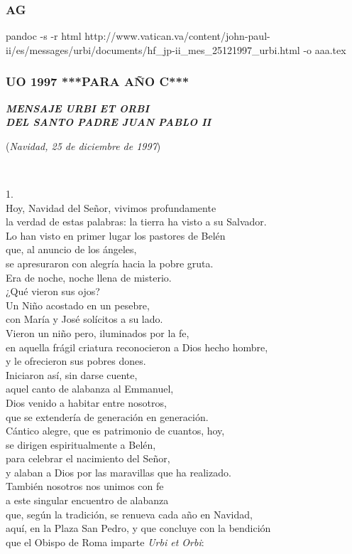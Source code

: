 \subsubsection{AG } pandoc -s -r html http://www.vatican.va/content/john-paul-ii/es/messages/urbi/documents/hf_jp-ii_mes_25121997_urbi.html -o aaa.tex

\subsubsection{UO 1997 ***PARA AÑO C*** } \emph{\textbf{MENSAJE URBI ET ORBI\\ DEL SANTO PADRE JUAN PABLO II}}

(\emph{Navidad, 25 de diciembre de 1997})

~

1. \\ Hoy, Navidad del Señor, vivimos profundamente\\ la verdad de estas palabras: la tierra ha visto a su Salvador.\\ Lo han visto en primer lugar los pastores de Belén\\ que, al anuncio de los ángeles,\\ se apresuraron con alegría hacia la pobre gruta.\\ Era de noche, noche llena de misterio.\\ ¿Qué vieron sus ojos?\\ Un Niño acostado en un pesebre,\\ con María y José solícitos a su lado.\\ Vieron un niño pero, iluminados por la fe,\\ en aquella frágil criatura reconocieron a Dios hecho hombre,\\ y le ofrecieron sus pobres dones.\\ Iniciaron así, sin darse cuente,\\ aquel canto de alabanza al Emmanuel,\\ Dios venido a habitar entre nosotros,\\ que se extendería de generación en generación.\\ Cántico alegre, que es patrimonio de cuantos, hoy,\\ se dirigen espiritualmente a Belén,\\ para celebrar el nacimiento del Señor,\\ y alaban a Dios por las maravillas que ha realizado.\\ También nosotros nos unimos con fe\\ a este singular encuentro de alabanza\\ que, según la tradición, se renueva cada año en Navidad,\\ aquí, en la Plaza San Pedro, y que concluye con la bendición\\ que el Obispo de Roma imparte \emph{Urbi et Orbi}:

